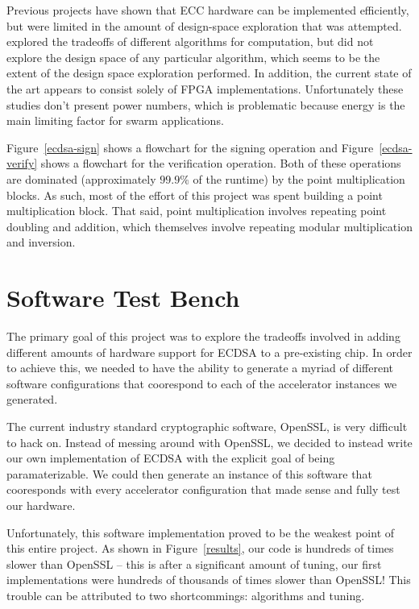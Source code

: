 \documentclass[twocolumn]{article}
\begin{document}
Previous projects\cite{nnll-ecdsa_hw} have shown that ECC hardware can
be implemented efficiently, but were limited in the amount of
design-space exploration that was attempted.  \cite{mmm-hw_ecc}
explored the tradeoffs of different algorithms for computation, but
did not explore the design space of any particular algorithm, which
seems to be the extent of the design space exploration performed.  In
addition, the current state of the art appears to consist solely of
FPGA implementations.  Unfortunately these studies don't present power
numbers, which is problematic because energy is the main limiting
factor for swarm applications.

Figure~\ref{ecdsa-sign} shows a flowchart for the signing operation
and Figure~\ref{ecdsa-verify} shows a flowchart for the verification
operation.  Both of these operations are dominated (approximately
$99.9\%$ of the runtime) by the point multiplication blocks.  As such,
most of the effort of this project was spent building a point
multiplication block.  That said, point multiplication involves
repeating point doubling and addition, which themselves involve
repeating modular multiplication and inversion.

\section{Software Test Bench}

The primary goal of this project was to explore the tradeoffs involved
in adding different amounts of hardware support for ECDSA to a
pre-existing chip.  In order to achieve this, we needed to have the
ability to generate a myriad of different software configurations that
coorespond to each of the accelerator instances we generated.

The current industry standard cryptographic software, OpenSSL, is very
difficult to hack on.  Instead of messing around with OpenSSL, we
decided to instead write our own implementation of ECDSA with the
explicit goal of being paramaterizable.  We could then generate an
instance of this software that cooresponds with every accelerator
configuration that made sense and fully test our hardware.

Unfortunately, this software implementation proved to be the weakest
point of this entire project.  As shown in Figure~\ref{results}, our
code is hundreds of times slower than OpenSSL -- this is after a
significant amount of tuning, our first implementations were hundreds
of thousands of times slower than OpenSSL!  This trouble can be
attributed to two shortcommings: algorithms and tuning.
\end{document}
